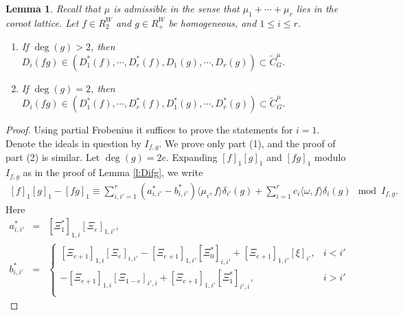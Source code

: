\documentclass[reqno]{amsart}
\numberwithin{equation}{subsection}
\newtheorem{lemma}[subsubsection]{Lemma}
\theoremstyle{definition}
\renewcommand{\j}[1]{\langle{#1}\rangle}
\newcommand{\wt}[1]{\widetilde{#1}}
\newcommand\ot{\otimes}
\renewcommand\d\delta
\newcommand\D\Delta
\newcommand{\om}{\omega}
\begin{document}
\begin{lemma} Recall that $\mu$ is admissible in the sense that $\mu_1+\cdots+\mu_r$ lies in the coroot lattice. Let  $f\in R^W_2$ and $g\in R^W_+$ be homogeneous, and $1\le i\le r$.
\begin{enumerate}
    \item If $\deg(g)>2$, then $D_i(fg)\in (D_1^*(f),\cdots, D_r^*(f), D_1(g),\cdots, D_r(g))\subset \wt C^\mu_G$.
    \item If $\deg(g)=2$, then $D_i(fg)\in (D_1^*(f),\cdots, D_r^*(f), D^*_1(g),\cdots, D^*_r(g))\subset \wt C^\mu_G$.
\end{enumerate}
\end{lemma}
\begin{proof} Using partial Frobenius it suffices to prove the statements for $i=1$. Denote the ideals in question by $I_{f,g}$. We prove only part (1), and the proof of part (2) is similar. Let $\deg(g)=2e$. Expanding $[f]_1[g]_1$ and $[fg]_1$ modulo $I_{f,g}$ as in the proof of Lemma \ref{l:Difg}, we write
    \begin{eqnarray}\label{fg1 deg 2}
        [f]_1[g]_1-[fg]_1\equiv \sum_{i,i'=1}^r(a^*_{i,i'}-b^*_{i,i'})\j{\mu_i,f}\d_{i'}(g)+\sum_{i=1}^rc_i\j{\om,f}\d_i(g)\mod I_{f,g}.
    \end{eqnarray}
    Here
    \begin{eqnarray*}
        a^*_{i,i'}&=&[\Xi^*_1]_{1,i}[\Xi_e]_{1,i'},\\
        b^*_{i,i'}&=&\begin{cases}
            [\Xi_{e+1}]_{1,i}[\Xi_e]_{i,i'}-[\Xi_{e+1}]_{1,i'}[\Xi^*_0]_{i,i'}+[\Xi_{e+1}]_{1,i'}[\xi]_{i'}, & i<i'\\
            

            -[\Xi_{e+1}]_{1,i}[\Xi_{1-e}]_{i',i}+[\Xi_{e+1}]_{1,i'}[\Xi_1^*]_{i',i}, & i>i'\\
            


\end{cases}
\end{eqnarray*}
\end{proof}
\end{document}
